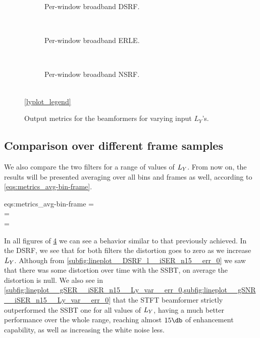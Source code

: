 \begin{figure}[!ht]
	\centering
	\begin{subfigure}{\textwidth}
			\centering
			
			\caption{Per-window broadband DSRF.}
			\label{subfig:lineplot__DSRF__iSER_n15__Ly_var__err_0}
		\end{subfigure}\\[1em]
	\begin{subfigure}{\textwidth}
			\centering
			
			\caption{Per-window broadband ERLE.}
			\label{subfig:lineplot__gSER__iSER_n15__Ly_var__err_0}
		\end{subfigure}\\[1em]
	\begin{subfigure}{\textwidth}
			\centering
			
			\caption{Per-window broadband NSRF.}
			\label{subfig:lineplot__gSNR__iSER_n15__Ly_var__err_0}
		\end{subfigure}\\[1em]
	\ref*{lyplot_legend}
	\caption{Output metrics for the beamformers for varying input $L_Y$'s.}
	\label{fig:lineplot__iSER_n15__Ly_var__err_0}
\end{figure}

\subsection{Comparison over different frame samples}

We also compare the two filters for a range of values of $\Ly$. From now on, the results will be presented averaging over all bins and frames as well, according to \cref{eqs:metrics_avg-bin-frame}.
\begin{subgather}{eqs:metrics_avg-bin-frame}
	\dsrf =  \\
	\gser =  \cdot {} \\
	\gsnr =  \cdot {}
\end{subgather}

In all figures of \cref{fig:lineplot__iSER_n15__Ly_var__err_0} we can see a behavior similar to that previously achieved. In the DSRF, we see that for both filters the distortion goes to zero as we increase $\Ly$. Although from \cref{subfig:lineplot__DSRF_l__iSER_n15__err_0} we saw that there was some distortion over time with the SSBT, on average the distortion is null. We also see in \cref{subfig:lineplot__gSER__iSER_n15__Ly_var__err_0,subfig:lineplot__gSNR__iSER_n15__Ly_var__err_0} that the STFT beamformer strictly outperformed the SSBT one for all values of $\Ly$, having a much better performance over the whole range, reaching almost $15\dB$ of enhancement capability, as well as increasing the white noise less.

